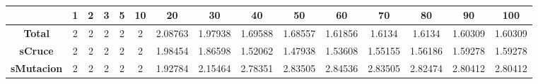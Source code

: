 \begin{table}[]
\begin{tabular}{|c|c|c|c|c|c|c|c|c|c|c|c|c|c|c|}
\hline
\multicolumn{1}{|l|}{} & \textbf{1}               & \textbf{2}               & \textbf{3}               & \textbf{5}               & \textbf{10}              & \textbf{20}                    & \textbf{30}                    & \textbf{40}                    & \textbf{50}                    & \textbf{60}                    & \textbf{70}                    & \textbf{80}                    & \textbf{90}                    & \textbf{100}                   \\ \hline
\textbf{Total}         & {\color[HTML]{4169E1} 2} & {\color[HTML]{4169E1} 2} & {\color[HTML]{4169E1} 2} & {\color[HTML]{4169E1} 2} & {\color[HTML]{4169E1} 2} & 2.08763                        & 1.97938                        & 1.69588                        & 1.68557                        & 1.61856                        & 1.6134                         & 1.6134                         & 1.60309                        & 1.60309                        \\ \hline
\textbf{sCruce}        & {\color[HTML]{4169E1} 2} & {\color[HTML]{4169E1} 2} & {\color[HTML]{4169E1} 2} & {\color[HTML]{4169E1} 2} & {\color[HTML]{4169E1} 2} & 1.98454                        & {\color[HTML]{4169E1} 1.86598} & {\color[HTML]{4169E1} 1.52062} & {\color[HTML]{4169E1} 1.47938} & {\color[HTML]{4169E1} 1.53608} & {\color[HTML]{4169E1} 1.55155} & {\color[HTML]{4169E1} 1.56186} & {\color[HTML]{4169E1} 1.59278} & {\color[HTML]{4169E1} 1.59278} \\ \hline
\textbf{sMutacion}     & {\color[HTML]{4169E1} 2} & {\color[HTML]{4169E1} 2} & {\color[HTML]{4169E1} 2} & {\color[HTML]{4169E1} 2} & {\color[HTML]{4169E1} 2} & {\color[HTML]{4169E1} 1.92784} & 2.15464                        & 2.78351                        & 2.83505                        & 2.84536                        & 2.83505                        & 2.82474                        & 2.80412                        & 2.80412                        \\ \hline
\end{tabular}
\caption{\label{table:HISTORICO}}
\end{table}
